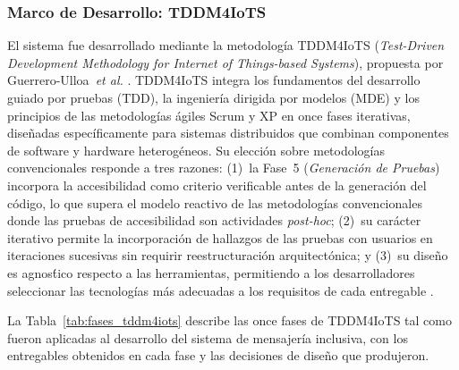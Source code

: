 \documentclass[journal]{IEEEtran}
\begin{document}
	\subsubsection{Marco de Desarrollo: TDDM4IoTS}
	El sistema fue desarrollado mediante la metodolog\'ia TDDM4IoTS (\textit{Test-Driven Development Methodology for Internet of Things-based Systems}), propuesta por Guerrero-Ulloa~\textit{et al.} \cite{guerrero2020}. TDDM4IoTS integra los fundamentos del desarrollo guiado por pruebas (TDD), la ingenier\'ia dirigida por modelos (MDE) y los principios de las metodolog\'ias \'agiles Scrum y XP en once fases iterativas, dise\~nadas espec\'ificamente para sistemas distribuidos que combinan componentes de software y hardware heterog\'eneos. Su elecci\'on sobre metodolog\'ias convencionales responde a tres razones: (1)~la Fase~5 (\textit{Generaci\'on de Pruebas}) incorpora la accesibilidad como criterio verificable antes de la generaci\'on del c\'odigo, lo que supera el modelo reactivo de las metodolog\'ias convencionales donde las pruebas de accesibilidad son actividades \textit{post-hoc}; (2)~su car\'acter iterativo permite la incorporaci\'on de hallazgos de las pruebas con usuarios en iteraciones sucesivas sin requirir reestructuraci\'on arquitect\'onica; y (3)~su dise\~no es agnos\'tico respecto a las herramientas, permitiendo a los desarrolladores seleccionar las tecnolog\'ias m\'as adecuadas a los requisitos de cada entregable \cite{guerrero2020}.
	
	La Tabla~\ref{tab:fases_tddm4iots} describe las once fases de TDDM4IoTS tal como fueron aplicadas al desarrollo del sistema de mensajer\'ia inclusiva, con los entregables obtenidos en cada fase y las decisiones de dise\~no que produjeron.
	
\end{document}
